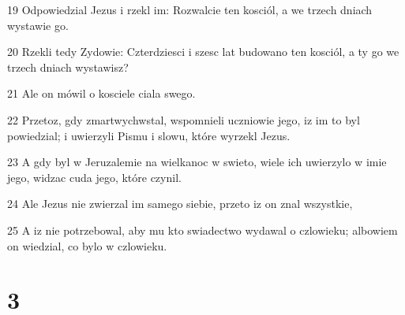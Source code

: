 \par 19 Odpowiedzial Jezus i rzekl im: Rozwalcie ten kosciól, a we trzech dniach wystawie go.
\par 20 Rzekli tedy Zydowie: Czterdziesci i szesc lat budowano ten kosciól, a ty go we trzech dniach wystawisz?
\par 21 Ale on mówil o kosciele ciala swego.
\par 22 Przetoz, gdy zmartwychwstal, wspomnieli uczniowie jego, iz im to byl powiedzial; i uwierzyli Pismu i slowu, które wyrzekl Jezus.
\par 23 A gdy byl w Jeruzalemie na wielkanoc w swieto, wiele ich uwierzylo w imie jego, widzac cuda jego, które czynil.
\par 24 Ale Jezus nie zwierzal im samego siebie, przeto iz on znal wszystkie,
\par 25 A iz nie potrzebowal, aby mu kto swiadectwo wydawal o czlowieku; albowiem on wiedzial, co bylo w czlowieku.

\chapter{3}

